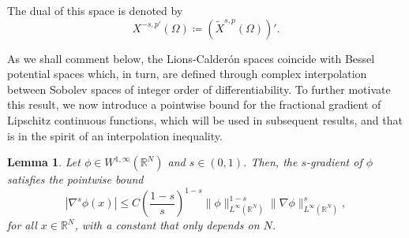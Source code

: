 \documentclass[]{amsart}
\newtheorem{Lemma}[theorem]{Lemma}
\theoremstyle{definition}
\theoremstyle{definition}
\theoremstyle{remark}
\numberwithin{equation}{section}
\begin{document}
The dual of this space is denoted by
\[
X^{-s, p'}(\Omega) \coloneq \left( \widetilde{X}^{s, p}(\Omega) \right)'.
\]

As we shall comment below, the Lions-Calder\'on spaces coincide with Bessel potential spaces which, in turn, are defined through complex interpolation between Sobolev spaces of integer order of differentiability. To further motivate this result,
we now introduce a pointwise bound for the fractional gradient of Lipschitz continuous functions, which will be used in subsequent results, and that is in the spirit of an interpolation inequality.
	\begin{Lemma}
		\label{Regularidad: Cota gradiente s de función regular}
		Let \( \phi \in W^{1,\infty}(\mathbb{R}^N) \) and \( s \in (0,1) \). Then, the \( s \)-gradient of $\phi$ satisfies the pointwise bound
		\begin{equation*}
			|\nabla^s \phi(x)| \leq 
			C \left(\frac{1-s}{s}\right)^{1-s} \|\phi\|_{L^\infty(\mathbb{R}^N)}^{1-s}
			\|\nabla\phi\|_{L^\infty(\mathbb{R}^N)}^{s},
		\end{equation*}
		for all  \( x \in \mathbb{R}^N \), with a constant  that only depends on $N$.
	\end{Lemma}
	
\end{document}
